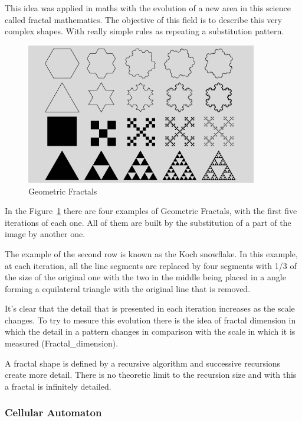 This idea was applied in maths with the evolution of a new area in this science called fractal mathematics. The objective of this field is to describe this very complex shapes. With really simple rules as repeating a substitution pattern. 

\begin{figure}[htbp]
	\centering
	\includegraphics[width=0.9\textwidth]{img/Theory/Fractals/Fractal1_1000.png}
	\caption{Geometric Fractals}
	\label{fig:GFractals}
\end{figure}

In the Figure~\ref{fig:GFractals} there are four examples of Geometric Fractals, with the first five iterations of each one. All of them are built by the substitution of a part of the image by another one. 

The example of the second row is known as the Koch snowflake. In this example, at each iteration, all the line segments are replaced by four segments with 1/3 of the size of the original one with the two in the middle being placed in a angle forming a equilateral triangle with the original line that is removed.

It's clear that the detail that is presented in each iteration increases as the scale changes. To try to mesure this evolution there is the idea of ​​fractal dimension in which the detail in a pattern changes in comparison with the scale in which it is measured (Fractal\_dimension). 

A fractal shape is defined by a recursive algorithm and successive recursions create more detail. There is no theoretic limit to the recursion size and with this a fractal is infinitely detailed. 





\subsubsection{Cellular Automaton} %
\label{ssub:cellular_automaton}


